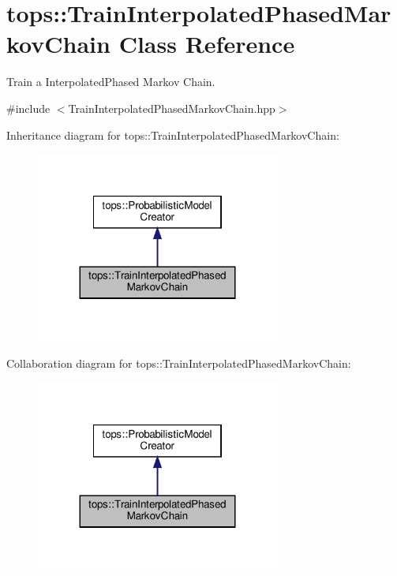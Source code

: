 \hypertarget{classtops_1_1TrainInterpolatedPhasedMarkovChain}{}\section{tops\+:\+:Train\+Interpolated\+Phased\+Markov\+Chain Class Reference}
\label{classtops_1_1TrainInterpolatedPhasedMarkovChain}


Train a Interpolated\+Phased Markov Chain.  




{\ttfamily \#include $<$Train\+Interpolated\+Phased\+Markov\+Chain.\+hpp$>$}



Inheritance diagram for tops\+:\+:Train\+Interpolated\+Phased\+Markov\+Chain\+:
\nopagebreak
\begin{figure}[H]
\begin{center}
\leavevmode
\includegraphics[width=227pt]{classtops_1_1TrainInterpolatedPhasedMarkovChain__inherit__graph}
\end{center}
\end{figure}


Collaboration diagram for tops\+:\+:Train\+Interpolated\+Phased\+Markov\+Chain\+:
\nopagebreak
\begin{figure}[H]
\begin{center}
\leavevmode
\includegraphics[width=227pt]{classtops_1_1TrainInterpolatedPhasedMarkovChain__coll__graph}
\end{center}
\end{figure}
